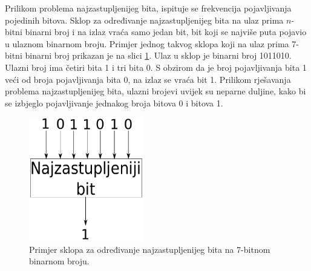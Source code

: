 \documentclass[times, utf8, zavrsni]{fer}
\begin{document}
Prilikom problema najzastupljenijeg bita, ispituje se frekvencija pojavljivanja pojedinih bitova.
Sklop za određivanje najzastupljenijeg bita na ulaz prima $n$-bitni binarni broj i na izlaz vraća samo jedan bit, bit koji se najviše puta pojavio u ulaznom binarnom broju.
Primjer jednog takvog sklopa koji na ulaz prima 7-bitni binarni broj prikazan je na slici \ref{img:majex}.
Ulaz u sklop je binarni broj 1011010.
Ulazni broj ima četiri bita 1 i tri bita 0.
S obzirom da je broj pojavljivanja bita 1 veći od broja pojavljivanja bita 0, na izlaz se vraća bit 1.
Prilikom rješavanja problema najzastupljenijeg bita, ulazni brojevi uvijek su neparne duljine, kako bi se izbjeglo pojavljivanje jednakog broja bitova 0 i bitova 1.
\begin{figure}[h]
    \centering
    \includegraphics[width=5cm]{img/majority.pdf}
    \caption{Primjer sklopa za određivanje najzastupljenijeg bita na 7-bitnom binarnom broju.}
    \label{img:majex}
\end{figure}
\end{document}
